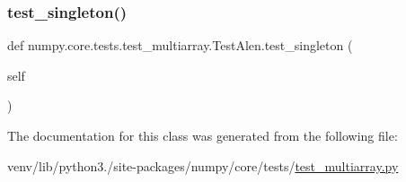 \subsubsection{\texorpdfstring{test\+\_\+singleton()}{test\_singleton()}}
{\footnotesize\ttfamily def numpy.\+core.\+tests.\+test\+\_\+multiarray.\+Test\+Alen.\+test\+\_\+singleton (\begin{DoxyParamCaption}\item[{}]{self }\end{DoxyParamCaption})}



The documentation for this class was generated from the following file\+:\begin{DoxyCompactItemize}
\item 
venv/lib/python3./site-\/packages/numpy/core/tests/\hyperlink{core_2tests_2test__multiarray_8py}{test\+\_\+multiarray.\+py}\end{DoxyCompactItemize}
